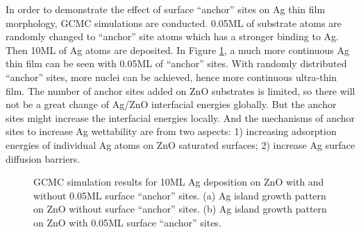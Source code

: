 In order to demonstrate the effect of surface ``anchor'' sites on Ag thin film morphology, \ac{GCMC} simulations are conducted. 0.05\ac{ML} of substrate atoms are randomly changed to ``anchor'' site atoms which has a stronger binding to Ag. Then 10\ac{ML} of Ag atoms are deposited. In Figure \ref{Chap:Ag/ZnO:fig14}, a much more continuous Ag thin film can be seen with 0.05\ac{ML} of ``anchor'' sites. With randomly distributed ``anchor'' sites, more nuclei can be achieved, hence more continuous ultra-thin film. The number of anchor sites added on ZnO substrates is limited, so there will not be a great change of Ag/ZnO interfacial energies globally. But the anchor sites might increase the interfacial energies locally. And the mechanisms of anchor sites to increase Ag wettability are from two aspects: 1) increasing adsorption energies of individual Ag atoms on ZnO saturated surfaces; 2) increase Ag surface diffusion barriers.

\newpage
\begingroup
\begin{figure}[!ht]
  \centering
  \label{Chap:Ag/ZnO:fig:14a}
  \label{Chap:Ag/ZnO:fig:14b}
\caption[GCMC simulation results for 10\ac{ML} Ag deposition on ZnO with and without 0.05\ac{ML} surface ``anchor'' sites.]{\ac{GCMC} simulation results for 10\ac{ML} Ag deposition on ZnO with and without 0.05\ac{ML} surface ``anchor'' sites. (a) Ag island growth pattern on ZnO without surface ``anchor'' sites. (b) Ag island growth pattern on ZnO with 0.05\ac{ML} surface ``anchor'' sites.}
\label{Chap:Ag/ZnO:fig14}
\end{figure}
\endgroup